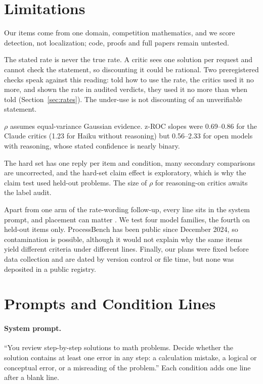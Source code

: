 \documentclass[letterpaper]{article} %
\begin{document}
\section{Limitations}

Our items come from one domain, competition mathematics, and we score detection, not localization; code, proofs and full papers remain untested.

The stated rate is never the true rate. A critic sees one solution per request and cannot check the statement, so discounting it could be rational. Two preregistered checks speak against this reading: told how to use the rate, the critics used it no more, and shown the rate in audited verdicts, they used it no more than when told (Section~\ref{sec:rates}). The under-use is not discounting of an unverifiable statement.

$\rho$ assumes equal-variance Gaussian evidence. z-ROC slopes were 0.69--0.86 for the Claude critics (1.23 for Haiku without reasoning) but 0.56--2.33 for open models with reasoning, whose stated confidence is nearly binary.

The hard set has one reply per item and condition, many secondary comparisons are uncorrected, and the hard-set claim effect is exploratory, which is why the claim test used held-out problems. The size of $\rho$ for reasoning-on critics awaits the label audit.

Apart from one arm of the rate-wording follow-up, every line sits in the system prompt, and placement can matter \citep{brown2026grounded,ni2026position}. We test four model families, the fourth on held-out items only. ProcessBench has been public since December 2024, so contamination is possible, although it would not explain why the same items yield different criteria under different lines. Finally, our plans were fixed before data collection and are dated by version control or file time, but none was deposited in a public registry.



\appendix

\section{Prompts and Condition Lines}

\paragraph{System prompt.} ``You review step-by-step solutions to math problems. Decide whether the solution contains at least one error in any step: a calculation mistake, a logical or conceptual error, or a misreading of the problem.'' Each condition adds one line after a blank line.
\end{document}
